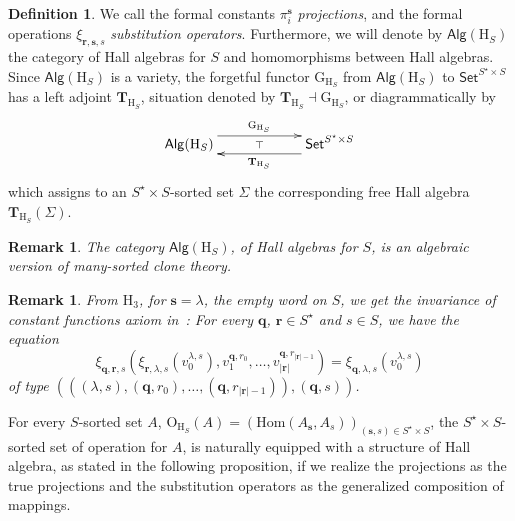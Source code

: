 \documentclass{amsart}
\newcommand{\uadj}{\top}           %
\newcommand{\bb}[1]{\ensuremath
	{\lvert #1 \rvert}}
\theoremstyle{plain}
\newtheorem{remark}[theorem]{Remark}
\theoremstyle{definition}
\newtheorem{definition}[theorem]{Definition}
\begin{document}
\begin{definition}
	We call the formal constants $\pi^{\mathbf{s}}_{i}$ \emph{projections}, and the formal operations $\xi_{\mathbf{r},\mathbf{s},s}$ \emph{substitution operators}. Furthermore, we will denote by $\mathsf{Alg}(\mathrm{H}_{S})$ the category of Hall algebras for $S$ and homomorphisms between Hall algebras.  Since $\mathsf{Alg}(\mathrm{H}_{S})$ is a variety, the forgetful functor $\mathrm{G}_{\mathrm{H}_{S}}$ from $\mathsf{Alg}(\mathrm{H}_{S})$ to $\mathsf{Set}^{S^{\star}\times S}$ has a left adjoint $\mathbf{T}_{\mathrm{H}_{S}}$, situation denoted by $\mathbf{T}_{\mathrm{H}_{S}}\dashv \mathrm{G}_{\mathrm{H}_{S}}$, or diagrammatically by
	$$
	\xymatrix@=5pc{ \mathsf{Alg}(\mathrm{H}_{S})
		\ar@<1.5ex>[r]^{\mathrm{G}_{\mathrm{H}_{S}}} \ar@{}[r]|{\uadj} &
		\mathsf{Set}^{S^{\star}\times S}
		\ar@<1.5ex>[l]^{\mathbf{T}_{\mathrm{H}_{S}}} }
	$$
	which assigns to an $S^{\star}\times S$-sorted set $\Sigma$ the corresponding free Hall algebra
	$\mathbf{T}_{\mathrm{H}_{S}}(\Sigma)$.
\end{definition}

\begin{remark}
	The category $\mathsf{Alg}(\mathrm{H}_{S})$, of Hall algebras for $S$, is an algebraic version of many-sorted clone theory.
\end{remark}

\begin{remark}
	From $\mathrm{H}_{3}$, for $\mathbf{s}=\lambda$, the empty word on $S$, we get the invariance of constant functions axiom in~\cite{gm85}: For every $\mathbf{q}$, $\mathbf{r}\in S^{\star}$ and $s\in S$, we have the equation
	$$
	\xi_{\mathbf{q},\mathbf{r},s}(\xi_{\mathbf{r},\lambda,s}(v^{\lambda,s}_{0}),v^{\mathbf{q},r_{0}}_{1},
	\ldots,v^{\mathbf{q},r_{\bb{\mathbf{r}}-1}}_{\bb{\mathbf{r}}})=
	\xi_{\mathbf{q},\lambda,s}(v^{\lambda,s}_{0})
	$$
	of type $(((\lambda,s),(\mathbf{q},r_{0}),\ldots,(\mathbf{q},r_{\bb{\mathbf{r}}-1})),(\mathbf{q},s))$.
\end{remark}

For every $S$-sorted set $A$, $\mathrm{O}_{\mathrm{H}_{S}}(A) = (\mathrm{Hom}(A_{\mathbf{s}},A_{s}))_{(\mathbf{s},s)\in S^{\star}\times S}$, the $S^{\star}\times S$-sorted set of operation for $A$, is naturally equipped with a structure of Hall algebra, as stated in the following proposition, if we realize the projections as the true projections and the substitution operators as the generalized composition of mappings.
\end{document}
